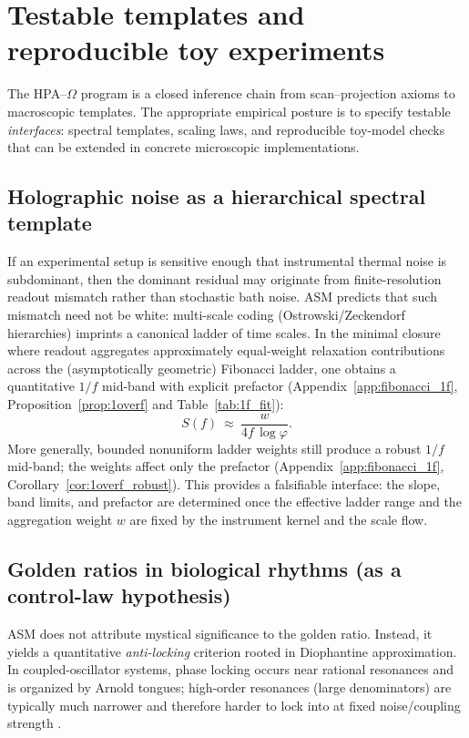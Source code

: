 \section{Testable templates and reproducible toy experiments}
\label{sec:predictions}

The HPA--$\Omega$ program is a closed inference chain from scan--projection axioms to macroscopic templates. The appropriate empirical posture is to specify testable \emph{interfaces}: spectral templates, scaling laws, and reproducible toy-model checks that can be extended in concrete microscopic implementations.

\subsection{Holographic noise as a hierarchical spectral template}

If an experimental setup is sensitive enough that instrumental thermal noise is subdominant, then the dominant residual may originate from finite-resolution readout mismatch rather than stochastic bath noise. ASM predicts that such mismatch need not be white: multi-scale coding (Ostrowski/Zeckendorf hierarchies) imprints a canonical ladder of time scales. In the minimal closure where readout aggregates approximately equal-weight relaxation contributions across the (asymptotically geometric) Fibonacci ladder, one obtains a quantitative $1/f$ mid-band with explicit prefactor (Appendix~\ref{app:fibonacci_1f}, Proposition~\ref{prop:1overf} and Table~\ref{tab:1f_fit}):
\begin{equation}
  S(f)\ \approx\ \frac{w}{4 f\,\log\varphi}.
\end{equation}
More generally, bounded nonuniform ladder weights still produce a robust $1/f$ mid-band; the weights affect only the prefactor (Appendix~\ref{app:fibonacci_1f}, Corollary~\ref{cor:1overf_robust}).
This provides a falsifiable interface: the slope, band limits, and prefactor are determined once the effective ladder range and the aggregation weight $w$ are fixed by the instrument kernel and the scale flow.

\subsection{Golden ratios in biological rhythms (as a control-law hypothesis)}

ASM does not attribute mystical significance to the golden ratio. Instead, it yields a quantitative \emph{anti-locking} criterion rooted in Diophantine approximation. In coupled-oscillator systems, phase locking occurs near rational resonances and is organized by Arnold tongues; high-order resonances (large denominators) are typically much narrower and therefore harder to lock into at fixed noise/coupling strength \cite{Strogatz1994,PikovskyRosenblumKurths2001}.

